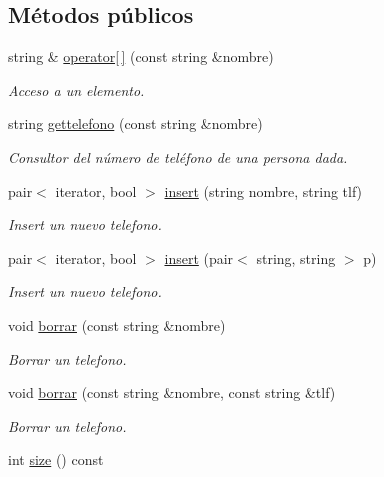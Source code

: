 \subsection*{Métodos públicos}
\begin{DoxyCompactItemize}
\item 
string \& \hyperlink{classGuia__Tlf_ab2c734a7f3f3cd63ad95f525502474ea}{operator\mbox{[}$\,$\mbox{]}} (const string \&nombre)
\begin{DoxyCompactList}\small\item\em Acceso a un elemento. \end{DoxyCompactList}\item 
string \hyperlink{classGuia__Tlf_a18593e3cf273db1a540cba69f87fd637}{gettelefono} (const string \&nombre)
\begin{DoxyCompactList}\small\item\em Consultor del número de teléfono de una persona dada. \end{DoxyCompactList}\item 
pair$<$ iterator, bool $>$ \hyperlink{classGuia__Tlf_add78a6fe5e8090ad6f71bbb160b70f77}{insert} (string nombre, string tlf)
\begin{DoxyCompactList}\small\item\em Insert un nuevo telefono. \end{DoxyCompactList}\item 
pair$<$ iterator, bool $>$ \hyperlink{classGuia__Tlf_a4c4e4cc9540896434edd915296e56c87}{insert} (pair$<$ string, string $>$ p)
\begin{DoxyCompactList}\small\item\em Insert un nuevo telefono. \end{DoxyCompactList}\item 
void \hyperlink{classGuia__Tlf_a57e32bbc9e76567d22e5275d4d2a6515}{borrar} (const string \&nombre)
\begin{DoxyCompactList}\small\item\em Borrar un telefono. \end{DoxyCompactList}\item 
void \hyperlink{classGuia__Tlf_af8adac24fd35985b9016a4a38cca60f4}{borrar} (const string \&nombre, const string \&tlf)
\begin{DoxyCompactList}\small\item\em Borrar un telefono. \end{DoxyCompactList}\item 
int \hyperlink{classGuia__Tlf_a727ab46d490b4196a71f623644906a81}{size} () const

\end{DoxyCompactItemize}
